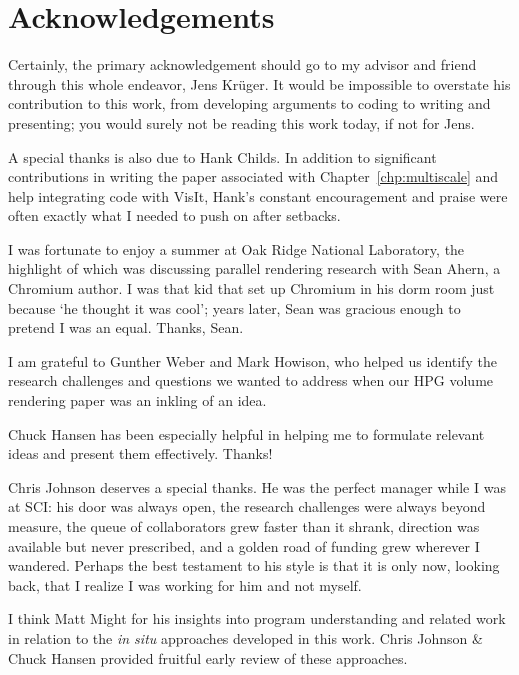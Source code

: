 \section*{Acknowledgements}

Certainly, the primary acknowledgement should go to my advisor and
friend through this whole endeavor, Jens Kr\"uger.  It would be
impossible to overstate his contribution to this work, from developing
arguments to coding to writing and presenting; you would surely not be
reading this work today, if not for Jens.

A special thanks is also due to Hank Childs.  In addition to
significant contributions in writing the paper associated with
Chapter~\ref{chp:multiscale} and help integrating code with VisIt,
Hank's constant encouragement and praise were often exactly what I
needed to push on after setbacks.

I was fortunate to enjoy a summer at Oak Ridge National Laboratory, the
highlight of which was discussing parallel rendering research with Sean
Ahern, a Chromium author.  I was that kid that set up Chromium in his
dorm room just because `he thought it was cool'; years later, Sean was
gracious enough to pretend I was an equal.  Thanks, Sean.

I am grateful to Gunther Weber and Mark Howison, who helped us identify
the research challenges and questions we wanted to address when our HPG
volume rendering paper was an inkling of an idea.

Chuck Hansen has been especially helpful in helping me to formulate
relevant ideas and present them effectively.  Thanks!


Chris Johnson deserves a special thanks.  He was the perfect manager
while I was at SCI: his door was always open, the research challenges
were always beyond measure, the queue of collaborators grew faster than
it shrank, direction was available but never prescribed, and a golden
road of funding grew wherever I wandered.  Perhaps the best testament
to his style is that it is only now, looking back, that I realize I was
working for him and not myself.

I think Matt Might for his insights into program understanding and
related work in relation to the \textit{in situ} approaches developed
in this work.  Chris Johnson \& Chuck Hansen provided fruitful early
review of these approaches.


